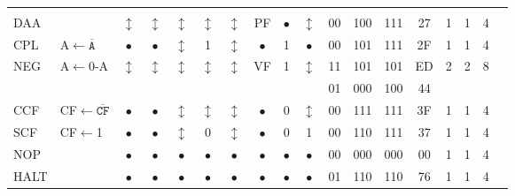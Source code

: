 \documentclass[oneside,a4paper]{book}
\newcommand{\instrt}{\rule{0pt}{2.7ex}}
\newcommand{\instrb}{\rule[-1.7ex]{0pt}{0pt}}
\begin{document}
{\tt \scriptsize \setlength{\fboxsep}{0.25mm}
	\setlength{\tabcolsep}{1mm}
	\begin{tabular}{llcccccccccccccccl}
		     
		\instrheader

	& & & & & & & & & & & & & & & & & \\

		DAA\instrt & & 
			$\updownarrow$ & 
				$\updownarrow$ & 
				$\updownarrow$ & 
				$\updownarrow$ & 
				$\updownarrow$ & 
				PF & 
				$\bullet$ & 
				$\updownarrow$ &
			00 & 100 & 111 & 
			27 & 1 & 
			1 & 4 & \instrb \\

		CPL\instrt & 
			A$\leftarrow\mathtt{\overline{A}}$ & 
			$\bullet$ & 
				$\bullet$ & 
				$\updownarrow$ & 
				1 & 
				$\updownarrow$ & 
				$\bullet$ & 
				1 & 
				$\bullet$ & 
			00 & 101 & 111 & 
			2F & 1 & 
			1 & 4 & \instrb \\

		NEG\instrt & 
			A$\leftarrow$0-A & 
			$\updownarrow$ & 
				$\updownarrow$ & 
				$\updownarrow$ & 
				$\updownarrow$ & 
				$\updownarrow$ & 
				VF & 
				1 & 
				$\updownarrow$ &
			11 & 101 & 101 & 
			ED & 2 & 
			2 & 8 & \\
		\multicolumn{10}{c}{} & 01 & 000 & 100 & 44 & \instrb \\

		CCF\instrt & 
			CF$\leftarrow\mathtt{\overline{CF}}$ & 
			$\bullet$ & 
				$\bullet$ & 
				$\updownarrow$\footnotemark[1] & 
				$\updownarrow$\footnotemark[2] & 
				$\updownarrow$\footnotemark[1] & 
				$\bullet$ & 
				0 & 
				$\updownarrow$ & 
			00 & 111 & 111 & 
			3F & 1 & 
			1 & 4 & \instrb \\

		SCF\instrt & 
			CF$\leftarrow$1 & 
			$\bullet$ & 
				$\bullet$ & 
				$\updownarrow$\footnotemark[1] & 
				0 & 
				$\updownarrow$\footnotemark[1] &
				 $\bullet$ & 
				 0 & 
				 1 & 
			00 & 110 & 111 & 
			37 & 1 & 
			1 & 4 & \instrb \\

		NOP\instrt & & 
			$\bullet$ & 
				$\bullet$ & 
				$\bullet$ & 
				$\bullet$ & 
				$\bullet$ & 
				$\bullet$ & 
				$\bullet$ & 
				$\bullet$ &
			00 & 000 & 000 & 
			00 & 1 & 
			1 & 4 & \instrb \\

		HALT\instrt & & 
			$\bullet$ & 
				$\bullet$ & 
				$\bullet$ & 
				$\bullet$ & 
				$\bullet$ & 
				$\bullet$ & 
				$\bullet$ & 
				$\bullet$ &
			01 & 110 & 110 & 
			76 & 1 & 
			1 & 4 & \instrb \\


\end{tabular}}
\end{document}
